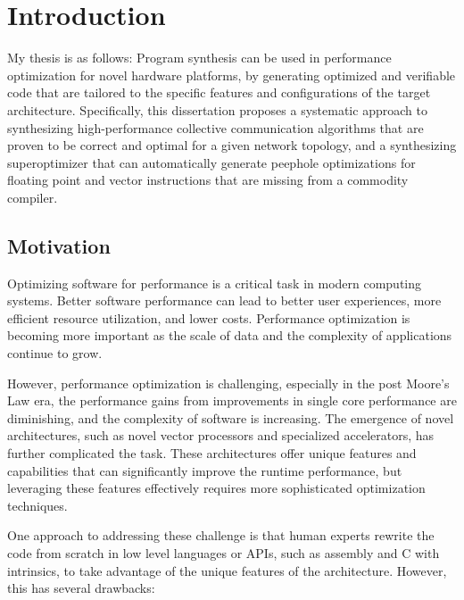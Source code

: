 \chapter{Introduction}
\label{chap:intro}

My thesis is as follows:
%
Program synthesis can be used in performance optimization for novel
hardware platforms, by generating optimized and verifiable code that
are tailored to the specific features and configurations of the target
architecture.
%
Specifically, this dissertation proposes a systematic approach to
synthesizing high-performance collective communication algorithms that
are proven to be correct and optimal for a given network topology, and
a synthesizing superoptimizer that can automatically generate peephole
optimizations for floating point and vector instructions that are
missing from a commodity compiler.

\section{Motivation}

Optimizing software for performance is a critical task in modern
computing systems.
%
Better software performance can lead to better user experiences, more
efficient resource utilization, and lower costs.
%
Performance optimization is becoming more important as the
scale of data and the complexity of applications continue to grow.


However, performance optimization is challenging, especially in the
post Moore's Law era, the performance gains from improvements in
single core performance are diminishing, and the complexity of
software is increasing.
%
The emergence of novel architectures, such as novel vector processors
and specialized accelerators, has further complicated the task.
%
These architectures offer unique features and capabilities that can
significantly improve the runtime performance, but leveraging these
features effectively requires more sophisticated optimization
techniques.

One approach to addressing these challenge is that human experts
rewrite the code from scratch in low level languages or APIs, such as assembly
and C with intrinsics, to take advantage of the unique features of the
architecture. However, this has several drawbacks:

